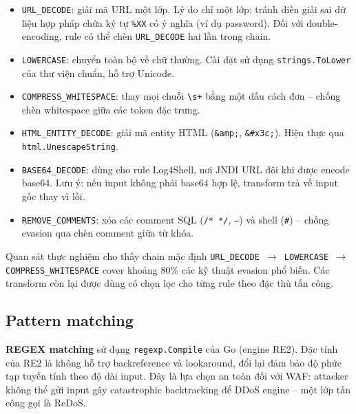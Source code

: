 \documentclass[../DoAn.tex]{subfiles}
\begin{document}
\begin{itemize}[leftmargin=*]
    \item \texttt{URL\_DECODE}: giải mã URL một lớp. Lý do chỉ một lớp: tránh
    diễn giải sai dữ liệu hợp pháp chứa ký tự \texttt{\%XX} có ý nghĩa
    (ví dụ password). Đối với double-encoding, rule có thể chèn
    \texttt{URL\_DECODE} hai lần trong chain.

    \item \texttt{LOWERCASE}: chuyển toàn bộ về chữ thường. Cài đặt sử dụng
    \texttt{strings.ToLower} của thư viện chuẩn, hỗ trợ Unicode.

    \item \texttt{COMPRESS\_WHITESPACE}: thay mọi chuỗi \texttt{\textbackslash s+}
    bằng một dấu cách đơn -- chống chèn whitespace giữa các token đặc trưng.

    \item \texttt{HTML\_ENTITY\_DECODE}: giải mã entity HTML
    (\texttt{\&amp;}, \texttt{\&\#x3c;}). Hiện thực qua
    \texttt{html.UnescapeString}.

    \item \texttt{BASE64\_DECODE}: dùng cho rule Log4Shell, nơi JNDI URL
    đôi khi được encode base64. Lưu ý: nếu input không phải base64 hợp lệ,
    transform trả về input gốc thay vì lỗi.

    \item \texttt{REMOVE\_COMMENTS}: xóa các comment SQL (\texttt{/* */},
    \texttt{--}) và shell (\texttt{\#}) -- chống evasion qua chèn comment
    giữa từ khóa.
\end{itemize}

Quan sát thực nghiệm cho thấy chain mặc định \texttt{URL\_DECODE \(\to\)
LOWERCASE \(\to\) COMPRESS\_WHITESPACE} cover khoảng 80\% các kỹ thuật
evasion phổ biến. Các transform còn lại được dùng có chọn lọc cho từng rule
theo đặc thù tấn công.

\subsection{Pattern matching}
\label{subsection:4.2.3}

\textbf{REGEX matching} sử dụng \texttt{regexp.Compile} của Go (engine
RE2). Đặc tính của RE2 là không hỗ trợ backreference và lookaround, đổi
lại đảm bảo độ phức tạp tuyến tính theo độ dài input. Đây là lựa chọn
an toàn đối với WAF: attacker không thể gửi input gây catastrophic
backtracking để DDoS engine -- một lớp tấn công gọi là ReDoS.
\end{document}
